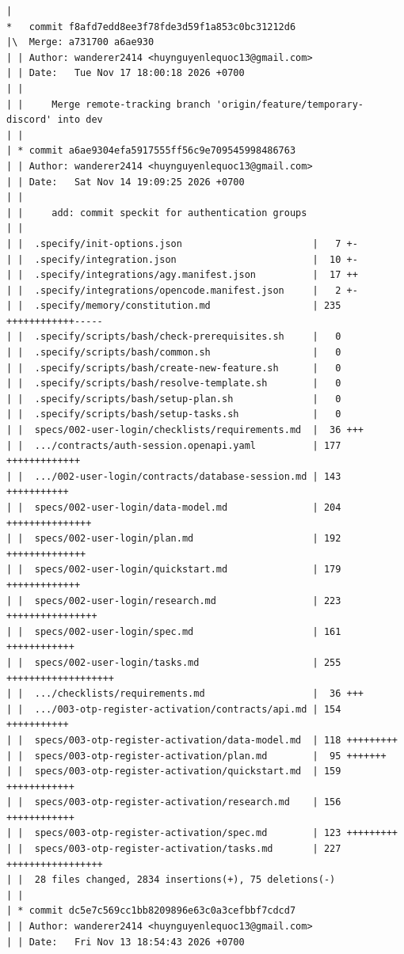 \documentclass[12pt]{article}
\begin{document}
\begin{lstlisting}[numbers=none,breaklines=true]
|
*   commit f8afd7edd8ee3f78fde3d59f1a853c0bc31212d6
|\  Merge: a731700 a6ae930
| | Author: wanderer2414 <huynguyenlequoc13@gmail.com>
| | Date:   Tue Nov 17 18:00:18 2026 +0700
| |
| |     Merge remote-tracking branch 'origin/feature/temporary-discord' into dev
| |
| * commit a6ae9304efa5917555ff56c9e709545998486763
| | Author: wanderer2414 <huynguyenlequoc13@gmail.com>
| | Date:   Sat Nov 14 19:09:25 2026 +0700
| |
| |     add: commit speckit for authentication groups
| |
| |  .specify/init-options.json                       |   7 +-
| |  .specify/integration.json                        |  10 +-
| |  .specify/integrations/agy.manifest.json          |  17 ++
| |  .specify/integrations/opencode.manifest.json     |   2 +-
| |  .specify/memory/constitution.md                  | 235 ++++++++++++-----
| |  .specify/scripts/bash/check-prerequisites.sh     |   0
| |  .specify/scripts/bash/common.sh                  |   0
| |  .specify/scripts/bash/create-new-feature.sh      |   0
| |  .specify/scripts/bash/resolve-template.sh        |   0
| |  .specify/scripts/bash/setup-plan.sh              |   0
| |  .specify/scripts/bash/setup-tasks.sh             |   0
| |  specs/002-user-login/checklists/requirements.md  |  36 +++
| |  .../contracts/auth-session.openapi.yaml          | 177 +++++++++++++
| |  .../002-user-login/contracts/database-session.md | 143 +++++++++++
| |  specs/002-user-login/data-model.md               | 204 +++++++++++++++
| |  specs/002-user-login/plan.md                     | 192 ++++++++++++++
| |  specs/002-user-login/quickstart.md               | 179 +++++++++++++
| |  specs/002-user-login/research.md                 | 223 ++++++++++++++++
| |  specs/002-user-login/spec.md                     | 161 ++++++++++++
| |  specs/002-user-login/tasks.md                    | 255 +++++++++++++++++++
| |  .../checklists/requirements.md                   |  36 +++
| |  .../003-otp-register-activation/contracts/api.md | 154 +++++++++++
| |  specs/003-otp-register-activation/data-model.md  | 118 +++++++++
| |  specs/003-otp-register-activation/plan.md        |  95 +++++++
| |  specs/003-otp-register-activation/quickstart.md  | 159 ++++++++++++
| |  specs/003-otp-register-activation/research.md    | 156 ++++++++++++
| |  specs/003-otp-register-activation/spec.md        | 123 +++++++++
| |  specs/003-otp-register-activation/tasks.md       | 227 +++++++++++++++++
| |  28 files changed, 2834 insertions(+), 75 deletions(-)
| |
| * commit dc5e7c569cc1bb8209896e63c0a3cefbbf7cdcd7
| | Author: wanderer2414 <huynguyenlequoc13@gmail.com>
| | Date:   Fri Nov 13 18:54:43 2026 +0700

\end{lstlisting}
\end{document}
